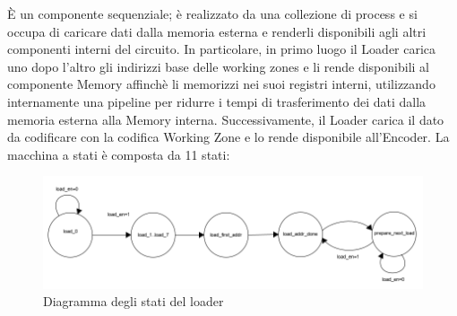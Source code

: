 \documentclass[10pt,english, openany]{book}
\begin{document}
È un componente sequenziale; è realizzato da una collezione di process e si occupa di caricare dati dalla memoria esterna e renderli disponibili agli altri componenti interni del circuito. In particolare, in primo luogo il Loader carica uno dopo l’altro gli indirizzi base delle working zones e li rende disponibili al componente Memory affinchè li memorizzi nei suoi registri interni, utilizzando internamente una pipeline per ridurre i tempi di trasferimento dei dati dalla memoria esterna alla Memory interna. Successivamente, il Loader carica il dato da codificare con la codifica Working Zone e lo rende disponibile all’Encoder. La macchina a stati è composta da 11 stati:
\begin{figure}[h!]
    \centering
    \includegraphics[scale=0.9]{stati_loader.png}
    \caption{Diagramma degli stati del loader}
    \label{fig:stati_loader}
\end{figure}{}
\end{document}

